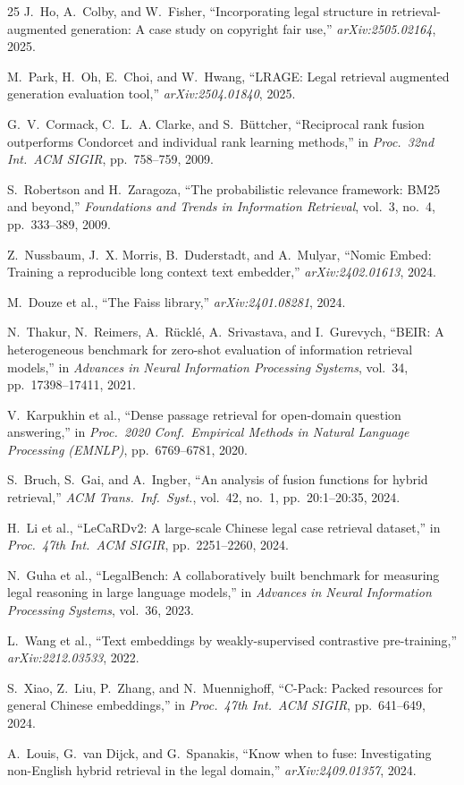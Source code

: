 \documentclass[conference,a4paper]{IEEEtran}
\begin{document}
\begin{thebibliography}{25}
J.~Ho, A.~Colby, and W.~Fisher,
``Incorporating legal structure in retrieval-augmented generation:
A case study on copyright fair use,''
\emph{arXiv:2505.02164}, 2025.

M.~Park, H.~Oh, E.~Choi, and W.~Hwang,
``LRAGE: Legal retrieval augmented generation evaluation tool,''
\emph{arXiv:2504.01840}, 2025.

G.~V.~Cormack, C.~L.~A. Clarke, and S.~B\"uttcher,
``Reciprocal rank fusion outperforms Condorcet and individual rank
learning methods,''
in \emph{Proc.\ 32nd Int.\ ACM SIGIR}, pp.~758--759, 2009.

S.~Robertson and H.~Zaragoza,
``The probabilistic relevance framework: BM25 and beyond,''
\emph{Foundations and Trends in Information Retrieval},
vol.~3, no.~4, pp.~333--389, 2009.

Z.~Nussbaum, J.~X. Morris, B.~Duderstadt, and A.~Mulyar,
``Nomic Embed: Training a reproducible long context text embedder,''
\emph{arXiv:2402.01613}, 2024.

M.~Douze et al.,
``The Faiss library,''
\emph{arXiv:2401.08281}, 2024.

N.~Thakur, N.~Reimers, A.~R\"uckl\'e, A.~Srivastava, and I.~Gurevych,
``BEIR: A heterogeneous benchmark for zero-shot evaluation of
information retrieval models,''
in \emph{Advances in Neural Information Processing Systems}, vol.~34,
pp.~17398--17411, 2021.

V.~Karpukhin et al.,
``Dense passage retrieval for open-domain question answering,''
in \emph{Proc.\ 2020 Conf.\ Empirical Methods in Natural Language
Processing (EMNLP)}, pp.~6769--6781, 2020.

S.~Bruch, S.~Gai, and A.~Ingber,
``An analysis of fusion functions for hybrid retrieval,''
\emph{ACM Trans.\ Inf.\ Syst.}, vol.~42, no.~1, pp.~20:1--20:35, 2024.

H.~Li et al.,
``LeCaRDv2: A large-scale Chinese legal case retrieval dataset,''
in \emph{Proc.\ 47th Int.\ ACM SIGIR}, pp.~2251--2260, 2024.

N.~Guha et al.,
``LegalBench: A collaboratively built benchmark for measuring legal
reasoning in large language models,''
in \emph{Advances in Neural Information Processing Systems}, vol.~36,
2023.

L.~Wang et al.,
``Text embeddings by weakly-supervised contrastive pre-training,''
\emph{arXiv:2212.03533}, 2022.

S.~Xiao, Z.~Liu, P.~Zhang, and N.~Muennighoff,
``C-Pack: Packed resources for general Chinese embeddings,''
in \emph{Proc.\ 47th Int.\ ACM SIGIR}, pp.~641--649, 2024.

A.~Louis, G.~van Dijck, and G.~Spanakis,
``Know when to fuse: Investigating non-English hybrid retrieval in the
legal domain,'' \emph{arXiv:2409.01357}, 2024.

\end{thebibliography}
\end{document}
